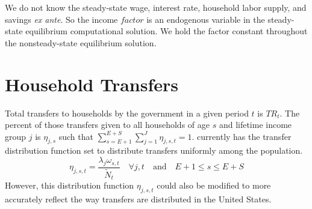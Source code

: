   We do not know the steady-state wage, interest rate, household labor supply, and savings \textit{ex ante}. So the income $factor$ is an endogenous variable in the steady-state equilibrium computational solution. We hold the factor constant throughout the nonsteady-state equilibrium solution.


\section{Household Transfers}\label{SecTaxCalcTfers}

  Total transfers to households by the government in a given period $t$ is $TR_t$. The percent of those transfers given to all households of age $s$ and lifetime income group $j$ is $\eta_{j,s}$ such that $\sum_{s=E+1}^{E+S}\sum_{j=1}^J\eta_{j,s,t}=1$. \ogindia currently has the transfer distribution function set to distribute transfers uniformly among the population.
  \begin{equation}\label{EqTaxCalcEtajs}
    \eta_{j,s,t} = \frac{\lambda_j\omega_{s,t}}{\tilde{N}_t} \quad\forall j,t \quad\text{and}\quad E+1\leq s\leq E+S
  \end{equation}
  However, this distribution function $\eta_{j,s,t}$ could also be modified to more accurately reflect the way transfers are distributed in the United States.
